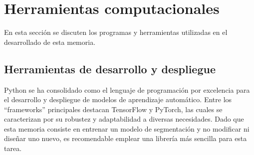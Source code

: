 \section{Herramientas computacionales}
En esta sección se discuten los programas y herramientas utilizadas en el desarrollado de esta memoria.

\subsection{Herramientas de desarrollo y despliegue}
Python se ha consolidado como el lenguaje de programación por excelencia para el desarrollo y despliegue de modelos de aprendizaje automático. Entre los ``frameworks'' principales destacan TensorFlow y PyTorch, las cuales se caracterizan por su robustez y adaptabilidad a diversas necesidades. Dado que esta memoria consiste en entrenar un modelo de segmentación y no modificar ni diseñar uno nuevo, es recomendable emplear una librería más sencilla para esta tarea.

